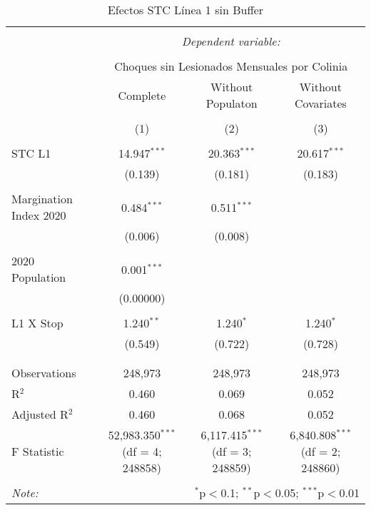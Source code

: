
\begin{table}[!htbp] \centering 
  \caption{Efectos STC Línea 1 sin Buffer} 
  \label{} 
\begin{tabular}{@{\extracolsep{5pt}}lccc} 
\\[-1.8ex]\hline 
\hline \\[-1.8ex] 
 & \multicolumn{3}{c}{\textit{Dependent variable:}} \\ 
\cline{2-4} 
\\[-1.8ex] & \multicolumn{3}{c}{Choques sin Lesionados Mensuales por Colinia} \\ 
 & Complete & Without Populaton & Without Covariates \\ 
\\[-1.8ex] & (1) & (2) & (3)\\ 
\hline \\[-1.8ex] 
 STC L1 & 14.947$^{***}$ & 20.363$^{***}$ & 20.617$^{***}$ \\ 
  & (0.139) & (0.181) & (0.183) \\ 
  & & & \\ 
 Margination Index 2020 & 0.484$^{***}$ & 0.511$^{***}$ &  \\ 
  & (0.006) & (0.008) &  \\ 
  & & & \\ 
 2020 Population & 0.001$^{***}$ &  &  \\ 
  & (0.00000) &  &  \\ 
  & & & \\ 
 L1 X Stop & 1.240$^{**}$ & 1.240$^{*}$ & 1.240$^{*}$ \\ 
  & (0.549) & (0.722) & (0.728) \\ 
  & & & \\ 
\hline \\[-1.8ex] 
Observations & 248,973 & 248,973 & 248,973 \\ 
R$^{2}$ & 0.460 & 0.069 & 0.052 \\ 
Adjusted R$^{2}$ & 0.460 & 0.068 & 0.052 \\ 
F Statistic & 52,983.350$^{***}$ (df = 4; 248858) & 6,117.415$^{***}$ (df = 3; 248859) & 6,840.808$^{***}$ (df = 2; 248860) \\ 
\hline 
\hline \\[-1.8ex] 
\textit{Note:}  & \multicolumn{3}{r}{$^{*}$p$<$0.1; $^{**}$p$<$0.05; $^{***}$p$<$0.01} \\ 
\end{tabular} 
\end{table} 
